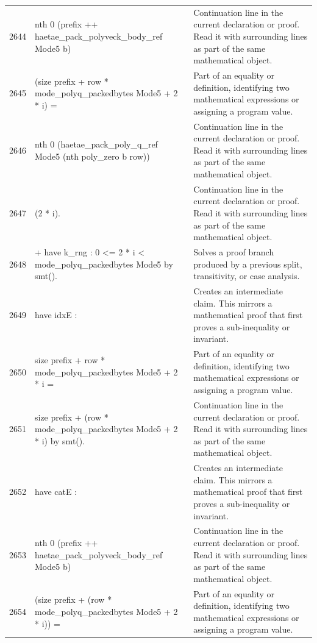 \documentclass[10pt]{article}
\begin{document}
\begin{longtable}{r L{0.53\textwidth} L{0.37\textwidth}}
2644 & {\ttfamily\scriptsize   nth 0 (prefix ++ haetae\_pack\_polyveck\_body\_ref Mode5 b)} & Continuation line in the current declaration or proof.  Read it with surrounding lines as part of the same mathematical object. \\
2645 & {\ttfamily\scriptsize     (size prefix + row * mode\_polyq\_packedbytes Mode5 + 2 * i) =} & Part of an equality or definition, identifying two mathematical expressions or assigning a program value. \\
2646 & {\ttfamily\scriptsize   nth 0 (haetae\_pack\_poly\_q\_ref Mode5 (nth poly\_zero b row))} & Continuation line in the current declaration or proof.  Read it with surrounding lines as part of the same mathematical object. \\
2647 & {\ttfamily\scriptsize     (2 * i).} & Continuation line in the current declaration or proof.  Read it with surrounding lines as part of the same mathematical object. \\
2648 & {\ttfamily\scriptsize + have k\_rng : 0 <= 2 * i < mode\_polyq\_packedbytes Mode5 by smt().} & Solves a proof branch produced by a previous split, transitivity, or case analysis. \\
2649 & {\ttfamily\scriptsize   have idxE :} & Creates an intermediate claim.  This mirrors a mathematical proof that first proves a sub-inequality or invariant. \\
2650 & {\ttfamily\scriptsize     size prefix + row * mode\_polyq\_packedbytes Mode5 + 2 * i =} & Part of an equality or definition, identifying two mathematical expressions or assigning a program value. \\
2651 & {\ttfamily\scriptsize     size prefix + (row * mode\_polyq\_packedbytes Mode5 + 2 * i) by smt().} & Continuation line in the current declaration or proof.  Read it with surrounding lines as part of the same mathematical object. \\
2652 & {\ttfamily\scriptsize   have catE :} & Creates an intermediate claim.  This mirrors a mathematical proof that first proves a sub-inequality or invariant. \\
2653 & {\ttfamily\scriptsize     nth 0 (prefix ++ haetae\_pack\_polyveck\_body\_ref Mode5 b)} & Continuation line in the current declaration or proof.  Read it with surrounding lines as part of the same mathematical object. \\
2654 & {\ttfamily\scriptsize       (size prefix + (row * mode\_polyq\_packedbytes Mode5 + 2 * i)) =} & Part of an equality or definition, identifying two mathematical expressions or assigning a program value. \\

\end{longtable}
\end{document}
